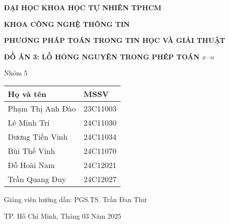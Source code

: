 \begin{titlepage}
    \centering
    \vspace*{1cm}
    
    {\Large\textbf{ĐẠI HỌC KHOA HỌC TỰ NHIÊN TPHCM}\par}
    {\Large\textbf{KHOA CÔNG NGHỆ THÔNG TIN}\par}
    \vspace{1.5cm}
    
    \vspace{1.5cm}
    
    {\Huge\textbf{PHƯƠNG PHÁP TOÁN TRONG TIN HỌC VÀ GIẢI THUẬT}\par}
    \vspace{1cm}
    {\LARGE\textbf{ĐỒ ÁN 3: LỖ HỎNG NGUYÊN TRONG PHÉP TOÁN $x \cdot n$}\par}
    \vspace{2cm}
    
    {\Large Nhóm 5\par}
    \vspace{0.5cm}
    
    \begin{center}
    \vspace{4pt} 
    \renewcommand{\arraystretch}{1.5} 
    \begin{tabular}{|>{\centering\arraybackslash}m{8cm}|>{\centering\arraybackslash}m{4cm}|}
        \hline
        \textbf{Họ và tên} & \textbf{MSSV} \\
        \hline
        Phạm Thị Anh Đào & 23C11003 \\
        \hline
        Lê Minh Trí & 24C11030 \\
        \hline
        Dương Tiến Vinh & 24C11034 \\
        \hline
        Bùi Thế Vinh & 24C11070 \\
        \hline
        Đỗ Hoài Nam & 24C12021 \\
        \hline
        Trần Quang Duy & 24C12027 \\
        \hline    
    \end{tabular}
\end{center}

    \vspace{3cm}
    
    {\Large Giảng viên hướng dẫn: PGS.TS. Trần Đan Thư\par}
    \vspace{1cm}
    {\Large TP. Hồ Chí Minh, Tháng 03 Năm 2025\par}
    
\end{titlepage}

